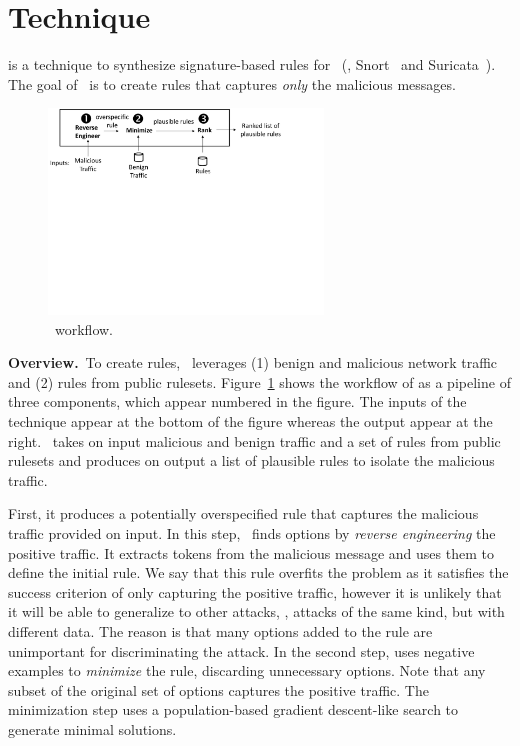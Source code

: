 \documentclass[sigconf,anonymous]{acmart}
\begin{document}
\section{Technique}

\tname{} is a technique to synthesize signature-based rules for
\nids~(\eg{}, Snort~\cite{snort} and Suricata~\cite{suricata}). The
goal of \tname\ is to create rules that captures \emph{only} the
malicious messages. 

\begin{figure}[t]
\centering
\includegraphics[trim=0 350 100 0,clip,width=0.65\textwidth]{figs/nids-workflow}
\caption{\tname\ workflow.}
\label{fig:overview}
\end{figure}

\vspace{1ex}
\noindent\textbf{Overview.}~To create rules, \tname\ leverages (1)
benign and malicious network traffic and (2) rules from public
rulesets. Figure~\ref{fig:overview} shows the workflow of \tname{} as
a pipeline of three components, which appear numbered in the figure.
The inputs of the technique appear at the bottom of the figure whereas
the output appear at the right. \tname\ takes on input malicious and
benign traffic and a set of rules from public rulesets and produces on
output a list of plausible rules to isolate the malicious traffic.


First, it produces a
potentially overspecified rule that captures the malicious traffic
provided on input. In this step, \tname\ finds options by
\emph{reverse engineering} the positive traffic. It extracts tokens
from the malicious message and uses them to define the initial
rule. We say that this rule overfits the problem as it satisfies the
success criterion of only capturing the positive traffic, however it
is unlikely that it will be able to generalize to other attacks,
\ie{}, attacks of the same kind, but with different data. The reason
is that many options added to the rule are unimportant for
discriminating the attack. In the second step, \tname{} uses negative
examples to \emph{minimize} the rule, discarding unnecessary
options. Note that any subset of the original set of options captures
the positive traffic. The minimization step uses a population-based
gradient descent-like search to generate minimal solutions.
\end{document}
